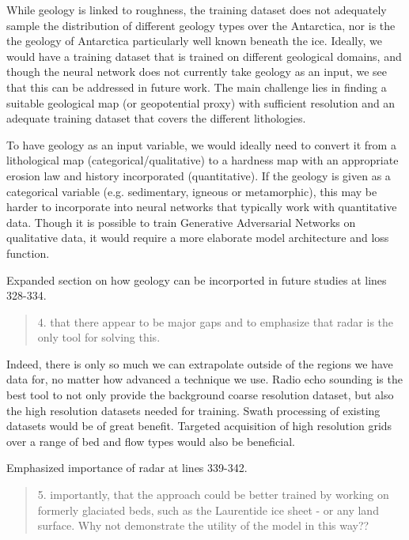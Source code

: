 \documentclass{article}
\begin{document}
While geology is linked to roughness, the training dataset does not adequately sample the distribution of different geology types over the Antarctica, nor is the the geology of Antarctica particularly well known beneath the ice.
Ideally, we would have a training dataset that is trained on different geological domains, and though the neural network does not currently take geology as an input, we see that this can be addressed in future work.
The main challenge lies in finding a suitable geological map (or geopotential proxy) with sufficient resolution and an adequate training dataset that covers the different lithologies.

To have geology as an input variable, we would ideally need to convert it from a lithological map (categorical/qualitative) to a hardness map with an appropriate erosion law and history incorporated (quantitative).
If the geology is given as a categorical variable (e.g. sedimentary, igneous or metamorphic), this may be harder to incorporate into neural networks that typically work with quantitative data.
Though it is possible to train Generative Adversarial Networks on qualitative data, it would require a more elaborate model architecture and loss function.

{
  \color{ForestGreen}
  Expanded section on how geology can be incorported in future studies at lines 328-334.
}

\begin{quote}
\color{blue}
  4. that there appear to be major gaps and to emphasize that radar is the only tool for solving this.
\end{quote}

Indeed, there is only so much we can extrapolate outside of the regions we have data for, no matter how advanced a technique we use.
Radio echo sounding is the best tool to not only provide the background coarse resolution dataset, but also the high resolution datasets needed for training.
Swath processing of existing datasets would be of great benefit.
Targeted acquisition of high resolution grids over a range of bed and flow types would also be beneficial.

{
  \color{ForestGreen}
  Emphasized importance of radar at lines 339-342.
}

\begin{quote}
\color{blue}
  5. importantly, that the approach could be better trained by working on formerly glaciated beds, such as the Laurentide ice sheet - or any land surface. Why not demonstrate the utility of the model in this way??
\end{quote}
\end{document}
